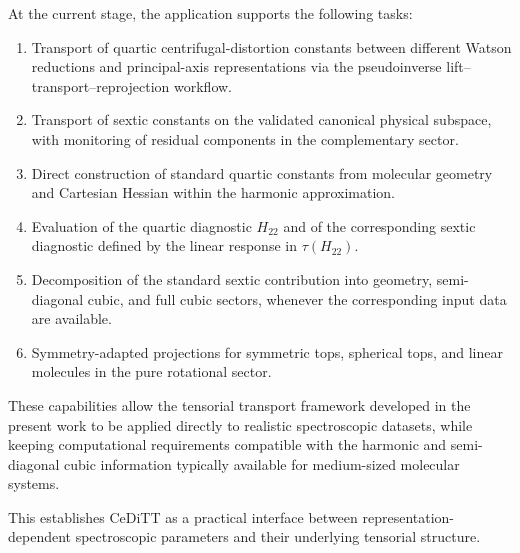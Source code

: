 \documentclass[aip,jcp,reprint,floatfix]{revtex4-2}
\begin{document}
At the current stage, the application supports the following tasks:

\begin{enumerate}

\item Transport of quartic centrifugal-distortion constants between
different Watson reductions and principal-axis representations via
the pseudoinverse lift–transport–reprojection workflow.

\item Transport of sextic constants on the validated canonical
physical subspace, with monitoring of residual components in the
complementary sector.

\item Direct construction of standard quartic constants from molecular
geometry and Cartesian Hessian within the harmonic approximation.

\item Evaluation of the quartic diagnostic $H_{22}$ and of the
corresponding sextic diagnostic defined by the linear response in
$\tau(H_{22})$.

\item Decomposition of the standard sextic contribution into geometry,
semi-diagonal cubic, and full cubic sectors, whenever the corresponding
input data are available.

\item Symmetry-adapted projections for symmetric tops, spherical tops,
and linear molecules in the pure rotational sector.

\end{enumerate}

These capabilities allow the tensorial transport framework developed
in the present work to be applied directly to realistic spectroscopic
datasets, while keeping computational requirements compatible with the
harmonic and semi-diagonal cubic information typically available for
medium-sized molecular systems.

This establishes CeDiTT as a practical interface between
representation-dependent spectroscopic parameters and their
underlying tensorial structure.



\end{document}
